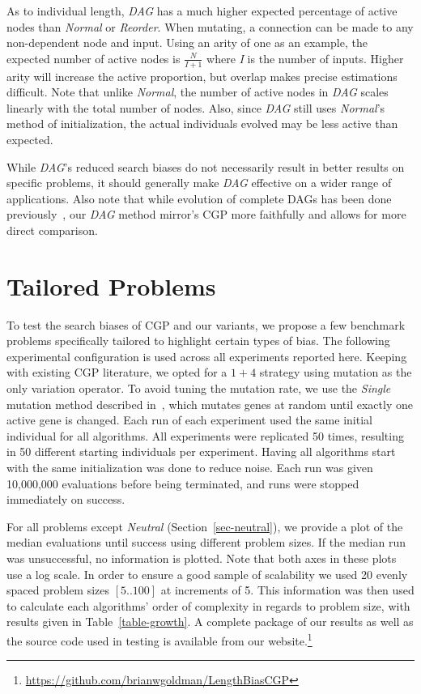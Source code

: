 \documentclass{sig-alternate}
\begin{document}
As to individual length, \emph{DAG} has a much higher expected percentage of active nodes
than \emph{Normal} or \emph{Reorder}.  When mutating, a connection can be made to
any non-dependent node and input.  Using an arity of one as an example, the
expected number of active nodes is $\frac{N}{I+1}$ where \emph{I} is the number
of inputs.  Higher arity will increase the active proportion, but overlap makes
precise estimations difficult.  Note that unlike \emph{Normal}, the number of
active nodes in \emph{DAG} scales linearly with the total number of nodes.  Also,
since \emph{DAG} still uses \emph{Normal}'s method of initialization, the actual
individuals evolved may be less active than expected.

While \emph{DAG}'s reduced search biases do not necessarily result in better results
on specific problems, it should generally make \emph{DAG} effective on a wider
range of applications.
Also note that while evolution of complete DAGs has been done previously~\cite{niehaus:2007:ggp},
our \emph{DAG} method mirror's CGP more faithfully and allows for more direct comparison.

\section{Tailored Problems}
\label{sec-tailored}
To test the search biases of CGP and our variants,
we propose a few benchmark problems specifically
tailored to highlight certain types of bias.
The following experimental configuration is used across all experiments reported here.
Keeping with existing CGP literature, we opted for a $1+4$ strategy using
mutation as the only variation operator.  To avoid tuning the mutation
rate, we use the \emph{Single} mutation method described in~\cite{goldman:2013:cgpwaste},
which mutates genes at random until exactly one active gene is changed.  
Each run of each experiment used the same initial individual for all algorithms.
All experiments were replicated 50 times, resulting in 50 different starting individuals per experiment.
Having all algorithms start with the same initialization was done to reduce noise.
Each
run was given 10,000,000 evaluations before being terminated, and runs were stopped
immediately on success.

For all problems except \emph{Neutral} (Section~\ref{sec-neutral}), we provide a plot of the median
evaluations until success using different problem sizes.  If the median run
was unsuccessful, no information is plotted.  Note that both axes in these plots
use a log scale.  In order to ensure a good sample of scalability we used 20
evenly spaced problem sizes $\left [ 5 .. 100 \right ]$ at increments of 5.
This information was then used to calculate each algorithms' order of complexity
in regards to problem size, with results given in Table~\ref{table-growth}.
A complete package of our results as well as the source code used in testing
is available from our website.\footnote{\url{https://github.com/brianwgoldman/LengthBiasCGP}}
\end{document}
